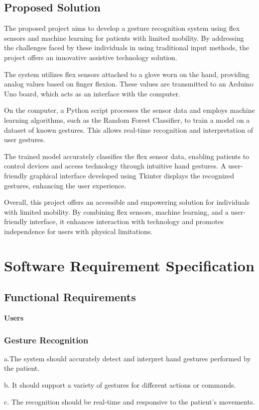 \documentclass[a4paper,12pt,oneside]{report}
\begin{document}
\section{Proposed Solution}
The proposed project aims to develop a gesture recognition system using flex sensors and machine learning for patients with limited mobility. By addressing the challenges faced by these individuals in using traditional input methods, the project offers an innovative assistive technology solution.

The system utilizes flex sensors attached to a glove worn on the hand, providing analog values based on finger flexion. These values are transmitted to an Arduino Uno board, which acts as an interface with the computer.

On the computer, a Python script processes the sensor data and employs machine learning algorithms, such as the Random Forest Classifier, to train a model on a dataset of known gestures. This allows real-time recognition and interpretation of user gestures.

The trained model accurately classifies the flex sensor data, enabling patients to control devices and access technology through intuitive hand gestures. A user-friendly graphical interface developed using Tkinter displays the recognized gestures, enhancing the user experience.

Overall, this project offers an accessible and empowering solution for individuals with limited mobility. By combining flex sensors, machine learning, and a user-friendly interface, it enhances interaction with technology and promotes independence for users with physical limitations.
	
 \newpage
 \chapter{Software Requirement Specification}
 \label{chap:model}
 \section{Functional Requirements}
 \textbf{\large Users}
 \subsection{Gesture Recognition}
 \par
   a.The system should accurately detect and interpret hand gestures performed by the patient.
 \par
 b. It should support a variety of gestures for different actions or commands.
 \par
c. The recognition should be real-time and responsive to the patient's movements.
\\
\end{document}
